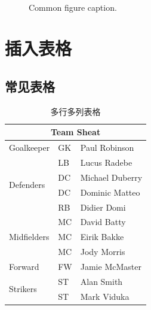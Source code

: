 \documentclass[fancyhdr,adobefonts,oneside,hyperref,openany,a4paper,UTF8]{ctexbook}
\begin{document}
\begin{figure}[htp]
    \centering
    \\
    \caption{Common figure caption.}
    \label{fig:sample_subfigures}
\end{figure}


\chapter{插入表格}
\section{常见表格}

\begin{table}[htp]
\centering
\caption{\label{tab:multicolumn}多行多列表格}
\begin{tabular}{|l|l|l|}
\hline
\multicolumn{3}{|c|}{Team Sheat} \\
\hline
Goalkeeper & GK & Paul Robinson \\
\hline
\multirow{4}{*}{Defenders} & LB & Lucus Radebe \\ & DC & Michael Duberry \\ & DC & Dominic Matteo \\ & RB & Didier Domi \\
\hline
\multirow{3}{*}{Midfielders} & MC & David Batty \\ & MC & Eirik Bakke \\ & MC & Jody Morris \\
\hline
Forward & FW & Jamie McMaster \\
\hline
\multirow{2}{*}{Strikers} & ST & Alan Smith \\ & ST & Mark Viduka \\
\hline
\end{tabular}
\end{table}
\end{document}
